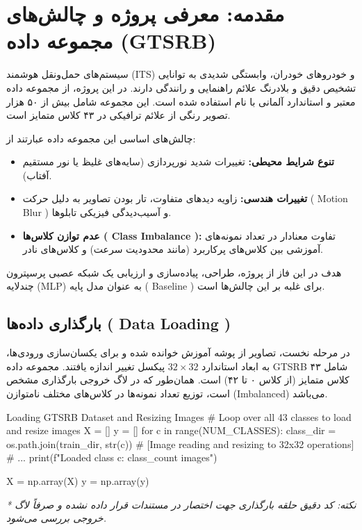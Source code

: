 \documentclass{article}
\begin{document}
	\tableofcontents
	\clearpage
\section{مقدمه: معرفی پروژه و چالش‌های مجموعه داده (GTSRB)}
سیستم‌های حمل‌ونقل هوشمند (ITS) و خودروهای خودران، وابستگی شدیدی به توانایی تشخیص دقیق و بلادرنگ علائم راهنمایی و رانندگی دارند. در این پروژه، از مجموعه داده معتبر و استاندارد آلمانی با نام  استفاده شده است. این مجموعه شامل بیش از ۵۰ هزار تصویر رنگی از علائم ترافیکی در ۴۳ کلاس متمایز است. 

چالش‌های اساسی این مجموعه داده عبارتند از:
\begin{itemize}
	\item \textbf{تنوع شرایط محیطی:} تغییرات شدید نورپردازی (سایه‌های غلیظ یا نور مستقیم آفتاب).
	\item \textbf{تغییرات هندسی:} زاویه دیدهای متفاوت، تار بودن تصاویر به دلیل حرکت ( Motion Blur ) و آسیب‌دیدگی فیزیکی تابلوها.
	\item \textbf{عدم توازن کلاس‌ها ( Class Imbalance ):} تفاوت معنادار در تعداد نمونه‌های آموزشی بین کلاس‌های پرکاربرد (مانند محدودیت سرعت) و کلاس‌های نادر.
\end{itemize}
هدف در این فاز از پروژه، طراحی، پیاده‌سازی و ارزیابی یک شبکه عصبی پرسپترون چندلایه (MLP) به عنوان مدل پایه ( Baseline ) برای غلبه بر این چالش‌ها است.

\subsection{بارگذاری داده‌ها ( Data Loading )}
در مرحله نخست، تصاویر از پوشه آموزش خوانده شده و برای یکسان‌سازی ورودی‌ها، به ابعاد استاندارد $32 \times 32$ پیکسل تغییر اندازه یافتند. مجموعه داده GTSRB شامل ۴۳ کلاس متمایز (از کلاس ۰ تا ۴۲) است. همان‌طور که در لاگ خروجی بارگذاری مشخص است، توزیع تعداد نمونه‌ها در کلاس‌های مختلف نامتوازن (Imbalanced) می‌باشد.

\begin{latin}
	\begin{vscodewindow}{Loading GTSRB Dataset and Resizing Images}
# Loop over all 43 classes to load and resize images
X = []
y = []
for c in range(NUM_CLASSES):
class_dir = os.path.join(train_dir, str(c))
# [Image reading and resizing to 32x32 operations]
# ...
print(f"Loaded class {c}: {class_count} images")

X = np.array(X)
y = np.array(y)
	\end{vscodewindow}
\end{latin}
\noindent
\textit{* نکته: کد دقیق حلقه بارگذاری جهت اختصار در مستندات قرار داده نشده و صرفاً لاگ خروجی بررسی می‌شود.}
\end{document}
